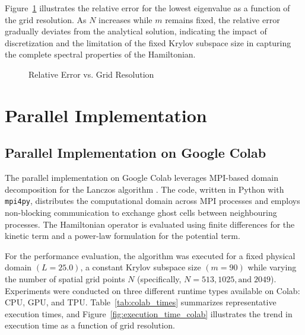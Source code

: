 \documentclass[12pt,a4paper]{report}
\begin{document}
Figure~\ref{fig:relative_error_vs_grid_resolution} illustrates the relative error for the lowest eigenvalue as a function of the grid resolution. As $N$ increases while $m$ remains fixed, the relative error gradually deviates from the analytical solution, indicating the impact of discretization and the limitation of the fixed Krylov subspace size in capturing the complete spectral properties of the Hamiltonian.
\begin{figure}[htbp]
\centering
{}
\caption{Relative Error vs. Grid Resolution}
\label{fig:relative_error_vs_grid_resolution}
\end{figure}

\section{Parallel Implementation}
\subsection{Parallel Implementation on Google Colab}

The parallel implementation on Google Colab leverages MPI-based domain decomposition for the Lanczos algorithm \cite{10.5555/248511}. The code, written in Python with \texttt{mpi4py}, distributes the computational domain across MPI processes and employs non-blocking communication to exchange ghost cells between neighbouring processes. The Hamiltonian operator is evaluated using finite differences for the kinetic term and a power-law formulation for the potential term.

For the performance evaluation, the algorithm was executed for a fixed physical domain $(L = 25.0)$, a constant Krylov subspace size $(m = 90)$ while varying the number of spatial grid points $N$ (specifically, $N = 513, 1025, \text{and} \; 2049$). Experiments were conducted on three different runtime types available on Colab: CPU, GPU, and TPU. Table~\ref{tab:colab_times} summarizes representative execution times, and Figure~\ref{fig:execution_time_colab} illustrates the trend in execution time as a function of grid resolution.
\end{document}
